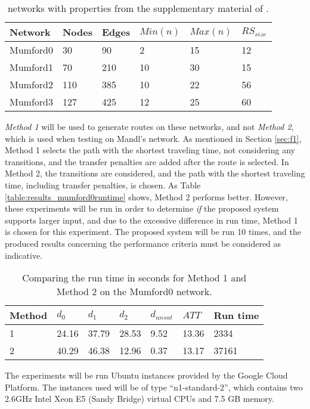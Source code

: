 \begin{table}[H]
	\centering
	\begin{tabular}{|l|l|l|l|l|l|}
    	\hline
    	\textbf{Network} & \textbf{Nodes}&\textbf{Edges} & $Min(n)$ & $Max(n)$ & $RS_{size}$\\
    	\hline
   	    Mumford0 & 30&90 & 2&15 & 12 \\
   	    Mumford1 & 70&210 & 10&30 & 15 \\
   	    Mumford2 & 110&385 & 10&22 & 56 \\
   	    Mumford3 & 127&425 & 12&25 & 60 \\
   	    \hline
    \end{tabular}
    \caption{networks with properties from the supplementary material of \citet{mumford13}.}
    \label{table:dataSet_mumford}
\end{table}

\textit{Method 1} will be used to generate routes on these networks, and not \textit{Method 2}, which is used when testing on Mandl's network. As mentioned in Section \vref{sec:f1}, Method 1 selects the path with the shortest traveling time, not considering any transitions, and the transfer penalties are added after the route is selected. In Method 2, the transitions are considered, and the path with the shortest traveling time, including transfer penalties, is chosen. As Table \vref{table:results_mumford0runtime} shows, Method 2 performs better. However, these experiments will be run in order to determine \textit{if} the proposed system supports larger input, and due to the excessive difference in run time, Method 1 is chosen for this experiment. The proposed system will be run 10 times, and the produced results concerning the performance criteria must be considered as indicative. 

\begin{table}[H]
    \centering
    \begin{tabular}{|l|l|l|l|l|l|l|}
        \hline
        \textbf{Method} & $d_0$ & $d_1$ & $d_2$ & $d_{unsat}$ & $ATT$ & \textbf{Run time} \\
        \hline
        1 & 24.16 & 37.79 & 28.53 & 9.52 & 13.36 & 2334 \\
        2 & 40.29 & 46.38 & 12.96 & 0.37 & 13.17 & 37161 \\
        \hline
    \end{tabular}
    \caption{Comparing the run time in seconds for Method 1 and Method 2 on the Mumford0 network.}
    \label{table:results_mumford0runtime}
\end{table}

The experiments will be run Ubuntu instances provided by the Google Cloud Platform\citep{website:google}. The instances used will be of type ``n1-standard-2'', which contains two 2.6GHz Intel Xeon E5 (Sandy Bridge) virtual CPUs and 7.5 GB memory.
